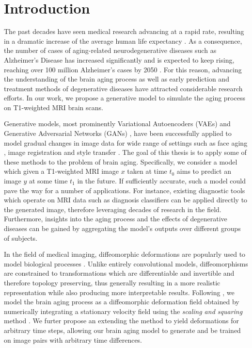\chapter{Introduction}




The past decades have seen medical research advancing at a rapid rate, resulting in a dramatic increase of the average human life expectancy \cite{owidlifeexpectancy}. As a consequence, the number of cases of aging-related neurodegenerative diseases such as Alzheimer's Disease has increased significantly and is expected to keep rising, reaching over 100 million Alzheimer's cases by 2050 \cite{brookmeyer2007forecasting}. For this reason, advancing the understanding of the brain aging process as well as early prediction and treatment methods of degenerative diseases have attracted considerable research efforts. In our work, we propose a generative model to simulate the aging process on T1-weighted MRI brain scans.%

Generative models, most prominently Variational Autoencoders (VAEs) \cite{kingma2013auto} and Generative Adversarial Networks (GANs) \cite{goodfellow2014generative}, have been successfully applied to model gradual changes in image data for wide range of settings such as face aging \cite{palsson2018generative}, image registration \cite{balakrishnan2019voxelmorph} and style transfer \cite{zhu2017unpaired}. The goal of this thesis is to apply some of these methods to the problem of brain aging. Specifically, we consider a model which given a T1-weighted MRI image $x$ taken at time $t_0$ aims to predict an image $y$ at some time $t_1$ in the future. If sufficiently accurate, such a model could pave the way for a number of applications. For instance, existing diagnostic tools which operate on MRI data such as diagnosis classifiers can be applied directly to the generated image, therefore leveraging decades of research in the field. Furthermore, insights into the aging process and the effects of degenerative diseases can be gained by aggregating the model's outputs over different groups of subjects.

In the field of medical imaging, diffeomorphic deformations are popularly used to model biological processes \cite{beg2005computing} \cite{ashburner2007fast}. Unlike entirely convolutional models, diffeomorphisms are constrained to transformations which are differentiable and invertible and therefore topology preserving, thus generally resulting in a more realistic representation while also producing more interpretable results. Following \cite{dalca2018unsupervised}, we model the brain aging process as a diffeomorphic deformation field obtained by numerically integrating a stationary velocity field using the \textit{scaling and squaring} method \cite{arsigny2006log}. We furter propose an extending the method to yield deformations for arbitrary time steps, allowing our brain aging model to generate and be trained on image pairs with arbitrary time differences. 

